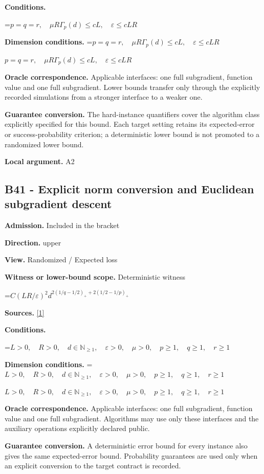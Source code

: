 \documentclass[10pt,a4paper]{article}
\newcommand{\AtlasMath}[1]{\par\begingroup\centering\setbox0=\hbox{$\displaystyle #1$}\ifdim\wd0>1.4\linewidth\typeout{ATLAS WIDE FORMULA: \the\wd0}\fi\ifdim\wd0>\linewidth\resizebox{\linewidth}{!}{\box0}\else\box0\fi\par\endgroup}
\newcommand{\AtlasInlineMath}[1]{\begingroup\setbox0=\hbox{$#1$}\ifdim\wd0>.4\linewidth\endgroup\AtlasMath{#1}\else\endgroup$#1$\fi}
\begin{document}
\textbf{Conditions.} 
\AtlasMath{p=q=r,\quad\mu R\Gamma_p(d)\le cL,\quad\varepsilon\le cLR}


\textbf{Dimension conditions.} \AtlasInlineMath{p=q=r,\quad\mu R\Gamma_p(d)\le cL,\quad\varepsilon\le cLR}

\textbf{Oracle correspondence.} Applicable interfaces: one full subgradient, function value and one full subgradient. Lower bounds transfer only through the explicitly recorded simulations from a stronger interface to a weaker one.

\textbf{Guarantee conversion.} The hard-instance quantifiers cover the algorithm class explicitly specified for this bound. Each target setting retains its expected-error or success-probability criterion; a deterministic lower bound is not promoted to a randomized lower bound.

\textbf{Local argument.} A2

\subsection{B41 - Explicit norm conversion and Euclidean subgradient descent}
\textbf{Admission.} Included in the bracket

\textbf{Direction.} upper

\textbf{View.} Randomized / Expected loss

\textbf{Witness or lower-bound scope.} Deterministic witness

\AtlasMath{C(LR/\varepsilon)^2d^{2(1/q-1/2)_++2(1/2-1/p)_+}}
\textbf{Sources.} \href{https://arxiv.org/pdf/1405.4980}{[1]}

\textbf{Conditions.} 
\AtlasMath{L>0,\quad R>0,\quad d\in\mathbb{N}_{\ge1},\quad \varepsilon>0,\quad \mu>0,\quad p\ge1,\quad q\ge1,\quad r\ge1}


\textbf{Dimension conditions.} \AtlasInlineMath{L>0,\quad R>0,\quad d\in\mathbb{N}_{\ge1},\quad \varepsilon>0,\quad \mu>0,\quad p\ge1,\quad q\ge1,\quad r\ge1}

\textbf{Oracle correspondence.} Applicable interfaces: one full subgradient, function value and one full subgradient. Algorithms may use only these interfaces and the auxiliary operations explicitly declared public.

\textbf{Guarantee conversion.} A deterministic error bound for every instance also gives the same expected-error bound. Probability guarantees are used only when an explicit conversion to the target contract is recorded.
\end{document}
